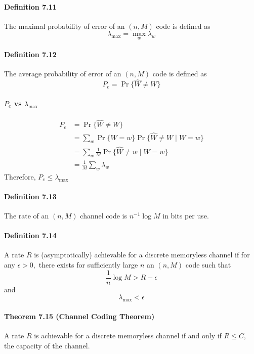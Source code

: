 \documentclass[8pt]{article}
\begin{document}
\paragraph{Definition 7.11} The maximal probability of error of an $(n, M)$ code is defined
as
$$
\lambda_{\max }=\max _{w} \lambda_{w}
$$
\paragraph{Definition 7.12} The average probability of error of an $(n, M)$ code is defined
as
$$
P_{e}=\operatorname{Pr}\{\hat{W} \neq W\}
$$
\paragraph{$P_{e}$ vs $\lambda_{\max }$}
$$
\begin{aligned}
P_{e} &=\operatorname{Pr}\{\hat{W} \neq W\} \\
&=\sum_{w} \operatorname{Pr}\{W=w\} \operatorname{Pr}\{\hat{W} \neq W \mid W=w\} \\
&=\sum_{w} \frac{1}{M} \operatorname{Pr}\{\hat{W} \neq w \mid W=w\} \\
&=\frac{1}{M} \sum_{w} \lambda_{w}
\end{aligned}
$$
Therefore, $P_{e} \leq \lambda_{\max }$

\paragraph{Definition 7.13} The rate of an $(n, M)$ channel code is $n^{-1} \log M$ in bits per
use.

\paragraph{Definition 7.14} A rate $R$ is (asymptotically) achievable for a discrete memoryless channel if for any $\epsilon>0,$ there exists for sufficiently large $n$ an $(n, M)$ code such that
$$
\frac{1}{n} \log M>R-\epsilon
$$
and
$$
\lambda_{\max }<\epsilon
$$
\paragraph{Theorem 7.15 (Channel Coding Theorem)} A rate $R$ is achievable for a discrete memoryless channel if and only if $R \leq C,$ the capacity of the channel.
\end{document}
